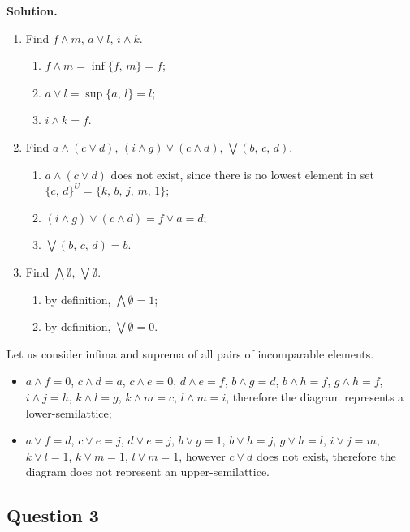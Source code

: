 \documentclass[14pt,a4paper]{extarticle}
\begin{document}
	\noindent\textbf{Solution.}
	\begin{enumerate}
		\item Find $f\land m,\, a\lor l,\, i\land k$.
	 	\begin{enumerate}
		 	\item $f\land m =\inf\{f,\, m\} = f$; 
		 	\item $a\lor l=\sup\{a,\, l\} = l$;
		 	\item $i\land k = f$.
	 	\end{enumerate}
	 	\item Find $a\land(c\lor d),\, (i\land g)\lor(c\land d),\, \bigvee(b,\, c,\, d)$.
	 	\begin{enumerate}
	 		\item $a\land(c\lor d)$ does not exist, since there is no lowest element in set $\{c,\,d\}^{U}=\{k,\, b,\, j,\, m,\, 1\}$; 
	 		\item $(i\land g)\lor(c\land d) = f\lor a = d$;
	 		\item $\bigvee(b,\, c,\, d) = b$.
	 	\end{enumerate}
	 	\newpage
	 	\item Find $\bigwedge \emptyset,\, \bigvee \emptyset$.
	 	\begin{enumerate}
	 		\item by definition, $\bigwedge \emptyset = 1$;
	 		\item by definition, $\bigvee \emptyset = 0$.
	 	\end{enumerate}
	\end{enumerate}
	 
	\noindent Let us consider infima and suprema of all pairs of incomparable elements. 
	\begin{itemize}
		\item $a\land f=0$, $c\land d=a$, $c\land e=0$, $d\land e=f$, $b\land g=d$, $b\land h=f$, $g\land h=f$, $i\land j=h$, $k\land l=g$, $k\land m=c$, $l\land m=i$,  therefore the diagram represents a lower-semilattice;
		\item $a\lor f=d$, $c\lor e=j$, $d\lor e=j$, $b\lor g=1$, $b\lor h=j$, $g\lor h=l$, $i\lor j=m$, $k\lor l=1$, $k\lor m=1$, $l\lor m=1$, however  $c\lor d$ does not exist,  therefore the diagram does not represent an upper-semilattice.
	\end{itemize}
	 
	\newpage
	\subsection*{Question 3}
	 
\end{document}
